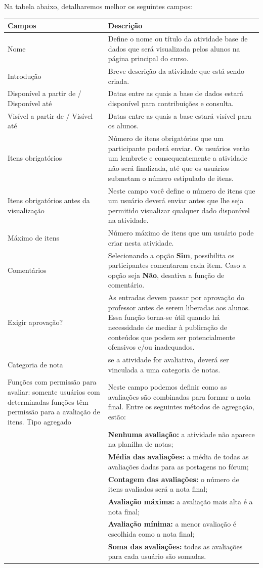 Na tabela abaixo, detalharemos melhor os seguintes campos:
\begin{longtable}{p{6cm}|p{9cm}}
   \hline
 \rowcolor[rgb]{0.8,0.8,0.8} \textbf{Campos} &  \textbf{Descrição}\\\hline
 {Nome} & Define o nome ou título da atividade base de dados que será visualizada pelos alunos na página principal do curso.\\\hline
 {Introdução} & Breve descrição da atividade que está sendo criada.\\\hline
 {Disponível a partir de / Disponível até} & Datas entre as quais a base de dados estará disponível para contribuições e consulta.\\\hline
 {Visível a partir de / Visível até} & Datas entre as quais a base estará visível para os alunos.\\\hline
 {Itens obrigatórios} & Número de itens obrigatórios que um participante poderá enviar. Os usuários verão um lembrete e consequentemente a atividade não será finalizada, até que os usuários submetam o número estipulado de itens.\\\hline
 {Itens obrigatórios antes da visualização} & Neste campo você define o número de itens que um usuário deverá enviar antes que lhe seja permitido visualizar qualquer dado disponível na atividade.\\\hline
 {Máximo de itens} & Número máximo de itens que um usuário pode criar nesta atividade.\\\hline
 {Comentários} & Selecionando a opção \textbf{Sim}, possibilita os participantes comentarem cada item. Caso a opção seja \textbf{Não}, desativa a função de comentário.\\\hline
 {Exigir aprovação?} & As entradas devem passar por aprovação do professor antes de serem liberadas aos alunos. Essa função torna-se útil quando há necessidade de mediar à publicação de conteúdos que podem ser potencialmente ofensivos e/ou inadequados.\\\hline
 {Categoria de nota} & se a atividade for avaliativa, deverá ser vinculada a uma categoria de notas.\\\hline
 {Funções com permissão para avaliar:} somente usuários com determinadas funções têm permissão para a avaliação de itens.
 {Tipo agregado} & Neste campo podemos definir como as avaliações são combinadas para formar a nota final. Entre os seguintes métodos de agregação, estão:\\
 & \textbf{Nenhuma avaliação:} a atividade não aparece na planilha de notas;\\
 & \textbf{Média das avaliações:} a média de todas as avaliações dadas para as postagens no fórum;\\
 & \textbf{Contagem das avaliações:} o número de itens avaliados será a nota final;\\
 & \textbf{Avaliação máxima:} a avaliação mais alta é a nota final;\\
 & \textbf{Avaliação mínima:} a menor avaliação é escolhida como a nota final;\\
 & \textbf{Soma das avaliações:} todas as avaliações para cada usuário são somadas.\\\hline


\end{longtable}
